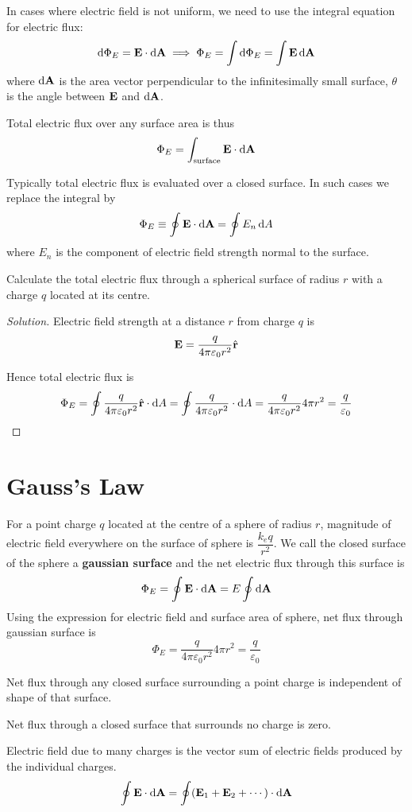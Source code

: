 In cases where electric field is not uniform, we need to use the integral equation for electric flux:
\[ \dd{\Phi}_E = \vb{E}\cdot\dd{\vb{A}} \implies \Phi_E = \int \dd{\Phi_E} = \int \vb{E} \dd{\vb{A}} \]
where $\dd{\vb{A}}$ is the area vector perpendicular to the infinitesimally small surface, $\theta$ is the angle between $\vb{E}$ and $\dd{\vb{A}}$.

Total electric flux over any surface area is thus
\[ \Phi_E = \int_\text{surface}\vb{E}\cdot\dd{\vb{A}} \]

Typically total electric flux is evaluated over a closed surface. In such cases we replace the integral by
\begin{equation}
{\Phi_E \equiv \oint\vb{E}\cdot\dd{\vb{A}} = \oint E_n\dd{A}
}\end{equation}
where $E_n$ is the component of electric field strength normal to the surface.
\pagebreak

\begin{exmp}
Calculate the total electric flux through a spherical surface of radius $r$ with a charge $q$ located at its centre.
\end{exmp}

\begin{proof}[Solution]
Electric field strength at a distance $r$ from charge $q$ is
\[ \vb{E} = \frac{q}{4\pi\varepsilon_0r^2}\hat{\vb{r}} \]

Hence total electric flux is
\[ \Phi_E = \oint\frac{q}{4\pi\varepsilon_0r^2}\hat{\vb{r}}\cdot\dd{A} = \oint\frac{q}{4\pi\varepsilon_0r^2}\cdot\dd{A} = \frac{q}{4\pi\varepsilon_0r^2}4\pi r^2 = \frac{q}{\varepsilon_0} \]
\end{proof}
\pagebreak

\section{Gauss's Law}
For a point charge $q$ located at the centre of a sphere of radius $r$, magnitude of electric field everywhere on the surface of sphere is $\dfrac{k_eq}{r^2}$. We call the closed surface of the sphere a \textbf{gaussian surface} and the net electric flux through this surface is
\[ \Phi_E = \oint\vb{E}\cdot\dd{\vb{A}} = E\oint\dd{\vb{A}} \]
Using the expression for electric field and surface area of sphere, net flux through gaussian surface is 
\[ \Phi_E = \frac{q}{4\pi\varepsilon_0r^2}4\pi r^2 = \frac{q}{\varepsilon_0} \]

\begin{remark}
Net flux through any closed surface surrounding a point charge is independent of shape of that surface.

Net flux through a closed surface that surrounds no charge is zero.

Electric field due to many charges is the vector sum of electric fields produced by the individual charges.
\[ \oint\vb{E}\cdot\dd{\vb{A}} = \oint(\vb{E}_1+\vb{E}_2+\cdots)\cdot\dd{\vb{A}} \]
\end{remark}

